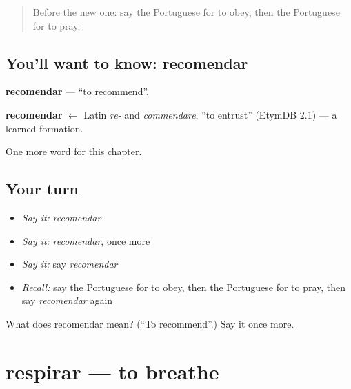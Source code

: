 \label{lesson:PT-C178-recomendar}



\begin{quote}
Before the new one: say the Portuguese for to obey, then the Portuguese for to pray.
\end{quote}

\subsection*{You'll want to know: recomendar}
\textbf{recomendar} — \textquotedblleft{}to recommend\textquotedblright{}.

\begin{cousinweb}
\textbf{recomendar} $\leftarrow$ Latin \emph{re-} and \emph{commendare}, \textquotedblleft{}to entrust\textquotedblright{} (EtymDB 2.1) — a learned formation.
\end{cousinweb}

\begin{grammarlens}[title={What you've built}]
One more word for this chapter.
\end{grammarlens}

\subsection*{Your turn}
\begin{itemize}
\raggedright
  \item \emph{Say it:} \emph{recomendar}
  \item \emph{Say it:} \emph{recomendar}, once more
  \item \emph{Say it:} say \emph{recomendar}
  \item \emph{Recall:} say the Portuguese for to obey, then the Portuguese for to pray, then say \emph{recomendar} again
\end{itemize}

\begin{tcolorbox}[breakable,colback=teal!4,colframe=teal!35!black,title={Before you move on}]
What does recomendar mean? (\textquotedblleft{}To recommend\textquotedblright{}.) Say it once more.
\end{tcolorbox}
\section[respirar]{respirar — to breathe}

\label{lesson:PT-C178-respirar}



